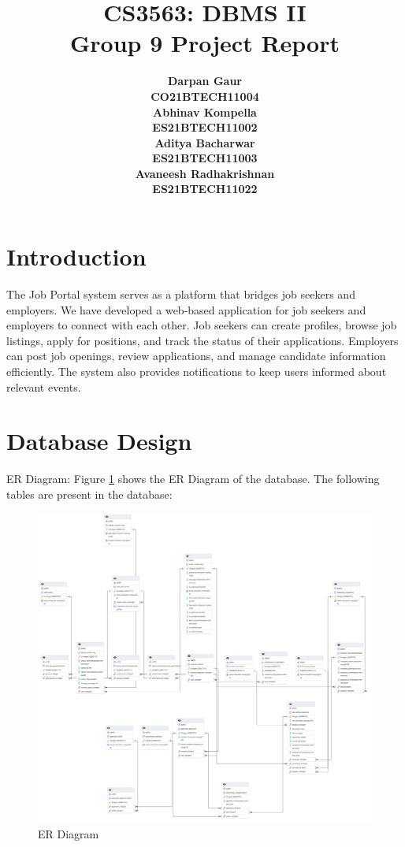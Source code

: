 \documentclass[12pt]{article}
\title{
    \textbf{CS3563: DBMS II} \\ 
    \textbf{Group 9 Project Report} \\
}
\author{
    \small
    \begin{tabular}{c}
        \textbf{Darpan Gaur} \\
        \textbf{CO21BTECH11004}
    \end{tabular}
    \begin{tabular}{c}
        \textbf{Abhinav Kompella} \\
        \textbf{ES21BTECH11002}
    \end{tabular}
    \begin{tabular}{c}
        \textbf{Aditya Bacharwar} \\
        \textbf{ES21BTECH11003}
    \end{tabular}
    \begin{tabular}{c}
        \textbf{Avaneesh Radhakrishnan} \\
        \textbf{ES21BTECH11022}
    \end{tabular}
}
\date{}
\begin{document}
\maketitle

\hrulefill

\section*{Introduction}
The Job Portal system serves as a platform that bridges job seekers and employers. We have developed a web-based application for job seekers and employers to connect with each other. Job seekers can create profiles, browse job listings, apply for positions, and track the status of their applications. Employers can post job openings, review applications, and manage candidate information efficiently. The system also provides notifications to keep users informed about relevant events.

\section*{Database Design}
ER Diagram: Figure \ref{fig:ER Diagram} shows the ER Diagram of the database.
The following tables are present in the database:
\begin{figure}[h]
    \centering
    \includegraphics[width=1.0\textwidth]{../images/ERD.png}
    \caption{ER Diagram}
    \label{fig:ER Diagram}
\end{figure}
\end{document}
